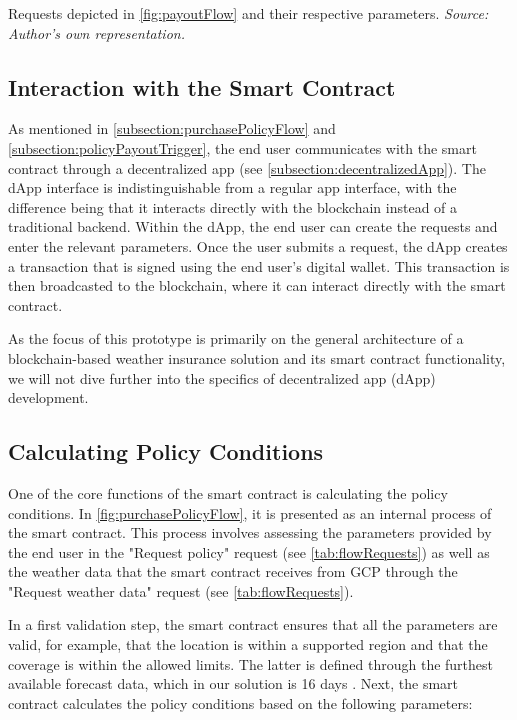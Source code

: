 \begin{table}[ht]
    \centering
    
    \caption{Requests depicted in \cref{fig:payoutFlow} and their respective parameters. \textit{Source: Author's own representation.}}
    \label{tab:payoutFlowRequests}
\end{table}

\subsection{Interaction with the Smart Contract}\label{interaction_with_smartcontract}
As mentioned in \cref{subsection:purchasePolicyFlow} and \cref{subsection:policyPayoutTrigger}, the end user communicates with the smart contract through a decentralized app (see \cref{subsection:decentralizedApp}). The dApp interface is indistinguishable from a regular app interface, with the difference being that it interacts directly with the blockchain instead of a traditional backend. Within the dApp, the end user can create the requests and enter the relevant parameters. Once the user submits a request, the dApp creates a transaction that is signed using the end user's digital wallet. This transaction is then broadcasted to the blockchain, where it can interact directly with the smart contract.

As the focus of this prototype is primarily on the general architecture of a blockchain-based weather insurance solution and its smart contract functionality, we will not dive further into the specifics of decentralized app (dApp) development.

\subsection{Calculating Policy Conditions}
One of the core functions of the smart contract is calculating the policy conditions. In \cref{fig:purchasePolicyFlow}, it is presented as an internal process of the smart contract. This process involves assessing the parameters provided by the end user in the "Request policy" request (see \cref{tab:flowRequests}) as well as the weather data that the smart contract receives from GCP through the "Request weather data" request (see \cref{tab:flowRequests}).

In a first validation step, the smart contract ensures that all the parameters are valid, for example, that the location is within a supported region and that the coverage is within the allowed limits. The latter is defined through the furthest available forecast data, which in our solution is 16 days \autocite{NOAA_GFS}. Next, the smart contract calculates the policy conditions based on the following parameters:

